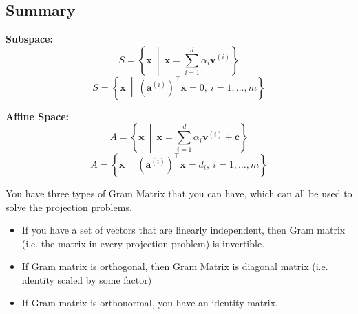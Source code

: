 \subsection{Summary}
\begin{definition}

    \textbf{Subspace:}
    \[
    S = \left\{ \mathbf{x} \ \middle| \ \mathbf{x} = \sum_{i=1}^{d} \alpha_i \mathbf{v}^{(i)} \right\}
    \]
    \[
    S = \left\{ \mathbf{x} \ \middle| \ (\mathbf{a}^{(i)})^\top \mathbf{x} = 0 , \ i=1, \dots, m \right\}
    \]

    \textbf{Affine Space:}
    \[
    A = \left\{ \mathbf{x} \ \middle| \ \mathbf{x} = \sum_{i=1}^{d} \alpha_i \mathbf{v}^{(i)} + \mathbf{c} \right\}
    \]
    \[
    A = \left\{ \mathbf{x} \ \middle| \ (\mathbf{a}^{(i)})^\top \mathbf{x} = d_i , \ i=1, \dots, m \right\}
    \]
\end{definition}

\begin{process}
    You have three types of Gram Matrix that you can have, which can all be used to solve the projection problems.
    \begin{itemize}
        \item If you have a set of vectors that are linearly independent, then Gram matrix (i.e. the matrix in every projection problem) is invertible.
        \item If Gram matrix is orthogonal, then Gram Matrix is diagonal matrix (i.e. identity scaled by some factor)
        \item If Gram matrix is orthonormal, you have an identity matrix.
    \end{itemize}
\end{process}
        
